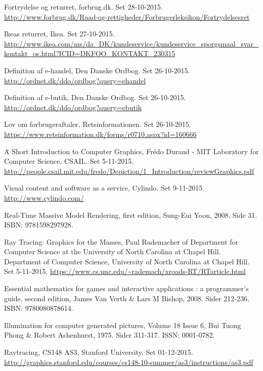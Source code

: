 \begin{thebibliography}{99}
  Fortrydelse og returret,
  forbrug.dk.
  Set 28-10-2015.
  \url{http://www.forbrug.dk/Raad-og-rettigheder/Forbrugerleksikon/Fortrydelsesret}

  Ikeas returret,
  Ikea.
  Set 27-10-2015.
  \url{http://www.ikea.com/ms/da_DK/kundeservice/kundeservice_sporgsmaal_svar_kontakt_os.html?ICID=DKFOO_KONTAKT_230315}
  
  Definition af e-handel,
  Den Danske Ordbog.
  Set 26-10-2015.
  \url{http://ordnet.dk/ddo/ordbog?query=ehandel}

  Definition af e-butik,
  Den Danske Ordbog.
  Set 26-10-2015. 
  \url{http://ordnet.dk/ddo/ordbog?query=ebutik}

  Lov om forbrugeraftaler,
  Retsinformationen.
  Set 26-10-2015.
  \url{https://www.retsinformation.dk/forms/r0710.aspx?id=160666}

  A Short Introduction to Computer Graphics,
  Frédo Durand - MIT Laboratory for Computer Science.
  CSAIL.
  Set 5-11-2015.
  \url{http://people.csail.mit.edu/fredo/Depiction/1_Introduction/reviewGraphics.pdf}
  
  Visual content and software as a service,
  Cylindo.
  Set 9-11-2015.
  \url{http://www.cylindo.com/}
  
  Real-Time Massive Model Rendering, first edition, Sung-Eui Yoon, 2008. Side 31. ISBN: 9781598297928.

  Ray Tracing: Graphics for the Masses, 
  Paul Rademacher of Department for Computer Science at the University of North Carolina at Chapel Hill.
  Department of Computer Science, University of North Carolina at Chapel Hill.
  Set 5-11-2015.
  \url{https://www.cs.unc.edu/~rademach/xroads-RT/RTarticle.html}

  Essential mathematics for games and interactive applications : a programmer's guide, second edition, James Van Verth & Lars M   Bishop, 2008. Sider 212-236. ISBN: 9780080878614.
  
  Illumination for computer generated pictures, Volume 18 Issue 6, Bui Tuong Phong & Robert Ashenhurst, 1975. Sider 311-317. ISSN: 0001-0782.

  Raytracing, 
  CS148 AS3, Stanford University. 
  Set 01-12-2015.
  \url{http://graphics.stanford.edu/courses/cs148-10-summer/as3/instructions/as3.pdf}


\end{thebibliography}
